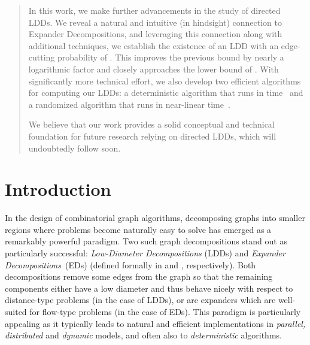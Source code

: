 \documentclass[letterpaper,11pt]{article}
\begin{document}
\begin{center}
\begin{minipage}[H]{14.5cm}
\begin{abstract}
			In this work, we make further advancements in the study of directed LDDs. We reveal a natural and intuitive (in hindsight) connection to Expander Decompositions, and leveraging this connection along with additional techniques, we establish the existence of an LDD with an edge-cutting probability of . This improves the previous bound by nearly a logarithmic factor and closely approaches the lower bound of . With significantly more technical effort, we also develop two efficient algorithms for computing our LDDs: a deterministic algorithm that runs in time~ and a randomized algorithm that runs in near-linear time~.

			We believe that our work provides a solid conceptual and technical foundation for future research relying on directed LDDs, which will undoubtedly follow soon.
		\end{abstract}
		
		\end{minipage}
	
\end{center}

\thispagestyle{empty}



\newpage
{}

\section{Introduction} \label{sec:intro}
In the design of combinatorial graph algorithms, decomposing graphs into smaller regions where problems become naturally easy to solve has emerged as a remarkably powerful paradigm. Two such graph decompositions stand out as particularly successful: \emph{Low-Diameter Decompositions} (LDDs) and \emph{Expander Decompositions}~(EDs) (defined formally in  and , respectively). Both decompositions remove some edges from the graph so that the remaining components either have a low diameter and thus behave nicely with respect to distance-type problems (in the case of LDDs), or are expanders which are well-suited for flow-type problems (in the case of EDs). This paradigm is particularly appealing as it typically leads to natural and efficient implementations in \emph{parallel,} \emph{distributed} and \emph{dynamic} models, and often also to \emph{deterministic} algorithms.
\end{document}
